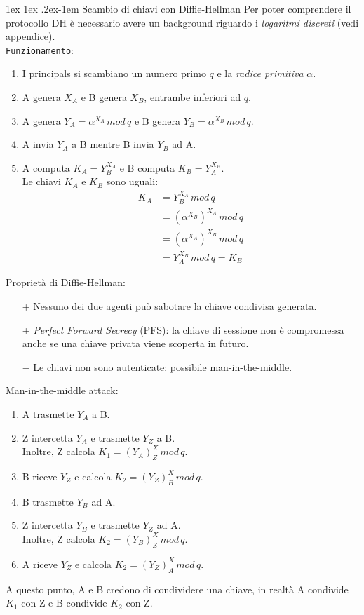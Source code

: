 \documentclass[a4paper, 11pt, twoside, openright, fleqn]{report}
\makeatletter
\renewcommand{\paragraph}{%
	\@startsection{paragraph}{4}%
	{\z@}{1ex \@plus 1ex \@minus .2ex}{-1em}%
	{\normalfont\normalsize\bfseries}%
}
\makeatother
\begin{document}
\paragraph{Scambio di chiavi con Diffie-Hellman}
Per poter comprendere il protocollo DH è necessario avere un background riguardo i \emph{logaritmi discreti} (vedi appendice).\\
\texttt{Funzionamento}:
\begin{enumerate}
	\item I principals si scambiano un numero primo $q$ e la \emph{radice primitiva} $\alpha$.
	\item A genera $X_A$ e B genera $X_B$, entrambe inferiori ad $q$.
	\item A genera $Y_A = \alpha^{X_A}\,mod\,q$ e B genera $Y_B = \alpha^{X_B}\,mod\,q$.
	\item A invia $Y_A$ a B mentre B invia $Y_B$ ad A.
	\item A computa $K_A = Y_B^{X_A}$ e B computa $K_B=Y_A^{X_B}$.\\
	Le chiavi $K_A$ e $K_B$ sono uguali:
	\begin{align*}
		K_A &= Y_B^{X_A}\,mod\,q\\
		&= (\alpha^{X_B})^{X_A}\,mod\,q\\
		&= (\alpha^{X_A})^{X_B}\,mod\,q\\
		&= Y_A^{X_B}\,mod\,q = K_B
	\end{align*}
\end{enumerate}
Proprietà di Diffie-Hellman:
\begin{itemize}
	\item[+] Nessuno dei due agenti può sabotare la chiave condivisa generata.
	\item[+] \emph{Perfect Forward Secrecy} (PFS): la chiave di sessione non è compromessa anche se una chiave privata viene scoperta in futuro.
	\item[$-$] Le chiavi non sono autenticate: possibile man-in-the-middle.
\end{itemize}
Man-in-the-middle attack:
\begin{enumerate}
	\item A trasmette $Y_A$ a B.
	\item Z intercetta $Y_A$ e trasmette $Y_Z$ a B.\\
	Inoltre, Z calcola $K_1 = (Y_A)^X_Z\,mod\,q$.
	\item B riceve $Y_Z$ e calcola $K_2 = (Y_Z)^X_B\,mod\,q$.
	\item B trasmette $Y_B$ ad A.
	\item Z intercetta $Y_B$ e trasmette $Y_Z$ ad A.\\
	Inoltre, Z calcola $K_2 = (Y_B)^X_Z\,mod\,q$.
	\item A riceve $Y_Z$ e calcola $K_2 = (Y_Z)^X_A\,mod\,q$.	
\end{enumerate}
A questo punto, A e B credono di condividere una chiave, in realtà A condivide $K_1$ con Z e B condivide $K_2$ con Z.
\end{document}
